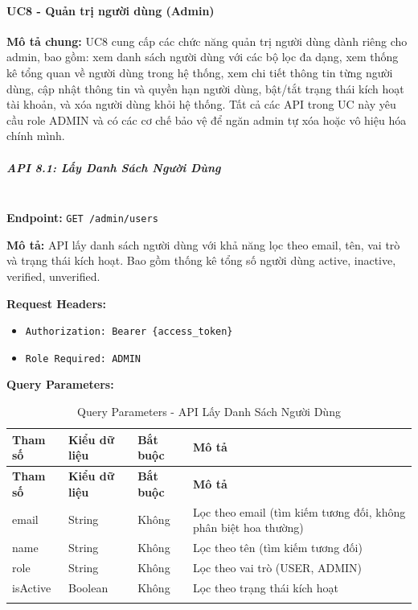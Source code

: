 \paragraph{UC8 - Quản trị người dùng (Admin)}

\textbf{Mô tả chung:} UC8 cung cấp các chức năng quản trị người dùng dành riêng cho admin, bao gồm: xem danh sách người dùng với các bộ lọc đa dạng, xem thống kê tổng quan về người dùng trong hệ thống, xem chi tiết thông tin từng người dùng, cập nhật thông tin và quyền hạn người dùng, bật/tắt trạng thái kích hoạt tài khoản, và xóa người dùng khỏi hệ thống. Tất cả các API trong UC này yêu cầu role ADMIN và có các cơ chế bảo vệ để ngăn admin tự xóa hoặc vô hiệu hóa chính mình.

\subparagraph{API 8.1: Lấy Danh Sách Người Dùng}~\\

\textbf{Endpoint:} \texttt{GET /admin/users}

\textbf{Mô tả:} API lấy danh sách người dùng với khả năng lọc theo email, tên, vai trò và trạng thái kích hoạt. Bao gồm thống kê tổng số người dùng active, inactive, verified, unverified.

\textbf{Request Headers:}
\begin{itemize}
    \item \texttt{Authorization: Bearer \{access\_token\}}
    \item \texttt{Role Required: ADMIN}
\end{itemize}

\textbf{Query Parameters:}

\small
\begin{longtable}{|>{\raggedright\arraybackslash}p{3.5cm}|>{\raggedright\arraybackslash}p{2.5cm}|>{\raggedright\arraybackslash}p{2cm}|>{\raggedright\arraybackslash}p{5.5cm}|}
\hline
\textbf{Tham số} & \textbf{Kiểu dữ liệu} & \textbf{Bắt buộc} & \textbf{Mô tả} \\
\hline
\endfirsthead
\hline
\textbf{Tham số} & \textbf{Kiểu dữ liệu} & \textbf{Bắt buộc} & \textbf{Mô tả} \\
\hline
\endhead
email & String & Không & Lọc theo email (tìm kiếm tương đối, không phân biệt hoa thường) \\
\hline
name & String & Không & Lọc theo tên (tìm kiếm tương đối) \\
\hline
role & String & Không & Lọc theo vai trò (USER, ADMIN) \\
\hline
isActive & Boolean & Không & Lọc theo trạng thái kích hoạt \\
\hline
\caption{Query Parameters - API Lấy Danh Sách Người Dùng}
\end{longtable}

